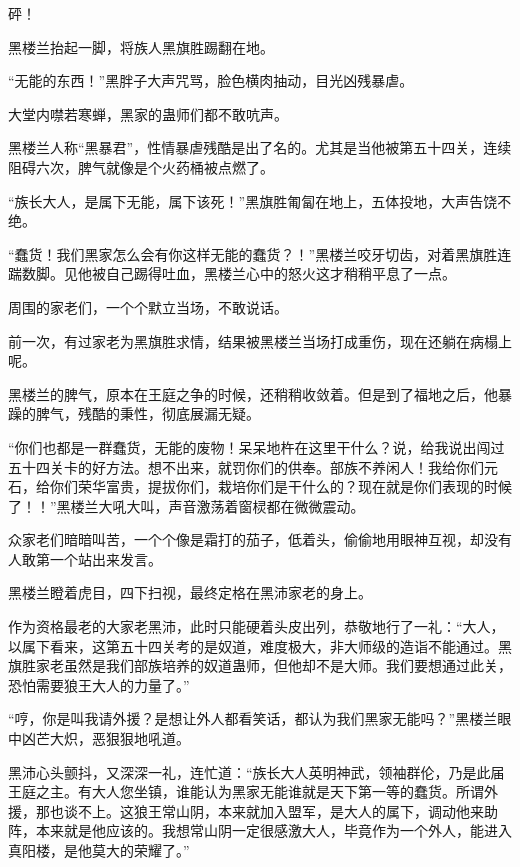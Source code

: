 
\begin{this_body}



砰！

黑楼兰抬起一脚，将族人黑旗胜踢翻在地。

“无能的东西！”黑胖子大声咒骂，脸色横肉抽动，目光凶残暴虐。

大堂内噤若寒蝉，黑家的蛊师们都不敢吭声。

黑楼兰人称“黑暴君”，性情暴虐残酷是出了名的。尤其是当他被第五十四关，连续阻碍六次，脾气就像是个火药桶被点燃了。

“族长大人，是属下无能，属下该死！”黑旗胜匍匐在地上，五体投地，大声告饶不绝。

“蠢货！我们黑家怎么会有你这样无能的蠢货？！”黑楼兰咬牙切齿，对着黑旗胜连踹数脚。见他被自己踢得吐血，黑楼兰心中的怒火这才稍稍平息了一点。

周围的家老们，一个个默立当场，不敢说话。

前一次，有过家老为黑旗胜求情，结果被黑楼兰当场打成重伤，现在还躺在病榻上呢。

黑楼兰的脾气，原本在王庭之争的时候，还稍稍收敛着。但是到了福地之后，他暴躁的脾气，残酷的秉性，彻底展漏无疑。

“你们也都是一群蠢货，无能的废物！呆呆地杵在这里干什么？说，给我说出闯过五十四关卡的好方法。想不出来，就罚你们的供奉。部族不养闲人！我给你们元石，给你们荣华富贵，提拔你们，栽培你们是干什么的？现在就是你们表现的时候了！！”黑楼兰大吼大叫，声音激荡着窗棂都在微微震动。

众家老们暗暗叫苦，一个个像是霜打的茄子，低着头，偷偷地用眼神互视，却没有人敢第一个站出来发言。

黑楼兰瞪着虎目，四下扫视，最终定格在黑沛家老的身上。

作为资格最老的大家老黑沛，此时只能硬着头皮出列，恭敬地行了一礼：“大人，以属下看来，这第五十四关考的是奴道，难度极大，非大师级的造诣不能通过。黑旗胜家老虽然是我们部族培养的奴道蛊师，但他却不是大师。我们要想通过此关，恐怕需要狼王大人的力量了。”

“哼，你是叫我请外援？是想让外人都看笑话，都认为我们黑家无能吗？”黑楼兰眼中凶芒大炽，恶狠狠地吼道。

黑沛心头颤抖，又深深一礼，连忙道：“族长大人英明神武，领袖群伦，乃是此届王庭之主。有大人您坐镇，谁能认为黑家无能谁就是天下第一等的蠢货。所谓外援，那也谈不上。这狼王常山阴，本来就加入盟军，是大人的属下，调动他来助阵，本来就是他应该的。我想常山阴一定很感激大人，毕竟作为一个外人，能进入真阳楼，是他莫大的荣耀了。”


\end{this_body}
